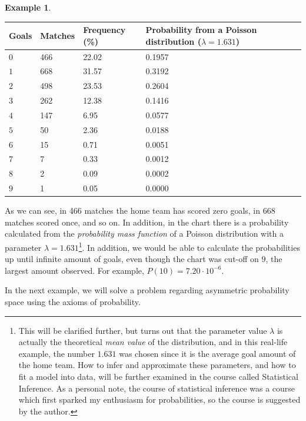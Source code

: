\documentclass[12pt,a4paper,leqno]{report}
\theoremstyle{plain}
\theoremstyle{definition}
\newtheorem{esim}[equation]{Example}
\begin{document}
\begin{esim}
\begin{tabular}{l l l L{6cm}}
\toprule
 Goals & Matches & Frequency (\%) & Probability from a Poisson distribution ($\lambda = 1.631$) \\
\midrule
$0$ & 466 & 22.02 & 0.1957 \\
$1$ & 668 & 31.57 & 0.3192\\
$2$ & 498 & 23.53 & 0.2604\\
$3$ & 262 & 12.38 & 0.1416\\
$4$ & 147 & 6.95 & 0.0577\\
$5$ & 50 & 2.36 & 0.0188\\
$6$ & 15 & 0.71 & 0.0051\\
$7$ &  7& 0.33 & 0.0012\\
$8$ &  2& 0.09 & 0.0002\\
$9$ &  1& 0.05 & 0.0000\\
\bottomrule 
\end{tabular}

\bigskip

As we can see, in 466 matches the home team has scored zero goals, in 668 matches scored once, and so on. In addition, in the chart there is a probability calculated from the \emph{probability mass function} of a Poisson distribution with a parameter $\lambda = 1.631$\footnote{This will be clarified further, but turns out that the parameter value $\lambda$ is actually the theoretical \emph{mean value} of the distribution, and in this real-life example, the number $1.631$ was chosen since it is the average goal amount of the home team. How to infer and approximate these parameters, and how to fit a model into data, will be further examined in the course called Statistical Inference. As a personal note, the course of statistical inference was a course which first sparked my enthusiasm for probabilities, so the course is suggested by the author.}. In addition, we would be able to calculate the probabilities up until infinite amount of goals, even though the chart was cut-off on $9$, the largest amount observed. For example, $P(10) = 7.20 \cdot 10^{-6}.$
\end{esim}

\bigskip

In the next example, we will solve a problem regarding asymmetric probability space using the axioms of probability.
\end{document}
